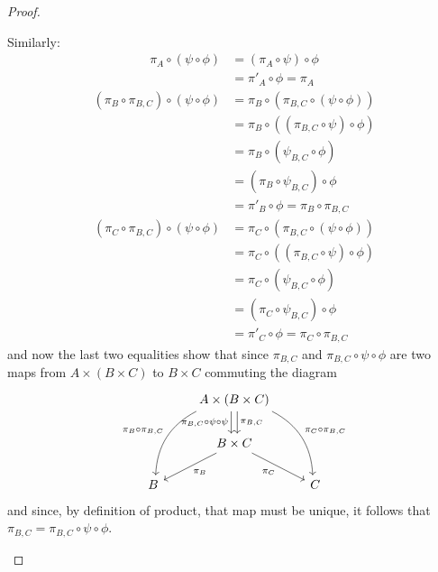 \begin{proof}
\begin{enumerate}[(a)]
		Similarly:
		\begin{align*}
			\pi_A\circ(\psi\circ\phi)&=(\pi_A\circ\psi)\circ\phi\\
			&=\pi'_A\circ\phi=\pi_A
		\end{align*}
		\begin{align*}
			(\pi_B\circ\pi_{B,C})\circ(\psi\circ\phi)&=\pi_B\circ(\pi_{B,C}\circ(\psi\circ\phi))\\
			&=\pi_B\circ((\pi_{B,C}\circ\psi)\circ\phi)\\
			&=\pi_B\circ(\psi_{B,C}\circ\phi)\\
			&=(\pi_B\circ\psi_{B,C})\circ\phi\\
			&=\pi'_B\circ\phi=\pi_B\circ\pi_{B,C}
		\end{align*}
		\begin{align*}
		(\pi_C\circ\pi_{B,C})\circ(\psi\circ\phi)&=\pi_C\circ(\pi_{B,C}\circ(\psi\circ\phi))\\
		&=\pi_C\circ((\pi_{B,C}\circ\psi)\circ\phi)\\
		&=\pi_C\circ(\psi_{B,C}\circ\phi)\\
		&=(\pi_C\circ\psi_{B,C})\circ\phi\\
		&=\pi'_C\circ\phi=\pi_C\circ\pi_{B,C}
		\end{align*}and now the last two equalities show that since $\pi_{B,C}$ and $\pi_{B,C}\circ\psi\circ\phi$ are two maps from $A\times(B\times C)$ to $B\times C$ commuting the diagram
		\[\begin{tikzcd}
		& A\times(B\times C) \arrow[ldd, "{\pi_B\circ\pi_{B,C}}"', bend right] \arrow[d, "{\pi_{B,C}}",shift left] \arrow[rdd, "{\pi_C\circ\pi_{B,C}}", bend left] \arrow[d, "{\pi_{B,C}\circ\psi\circ\psi}"',shift right] &   \\
		& B\times C \arrow[ld, "\pi_B"] \arrow[rd, "\pi_C"']                                                                                                                                       &   \\
		B &                                                                                                                                                                                          & C
		\end{tikzcd}\]and since, by definition of product, that map must be unique, it follows that $\pi_{B,C}=\pi_{B,C}\circ\psi\circ\phi$.
		

\end{enumerate}
\end{proof}
